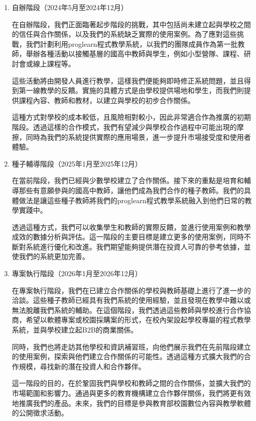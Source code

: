 \begin{enumerate}
  \setlength{\parindent}{2em}
  \item 自辦階段（2024年5月至2024年12月）
  \par 在自辦階段，我們正面臨著起步階段的挑戰，其中包括尚未建立起與學校之間的信任與合作關係，以及我們的系統缺乏實際的使用案例。為了應對這些挑戰，我們計劃利用proglearn程式教學系統，以我們的團隊成員作為第一批教師，舉辦各種活動以接觸基層的國高中教師與學生，例如小型營隊、課程、研討會或線上課程等。
  \par 這些活動將由開發人員進行教學，這樣我們便能夠即時修正系統問題，並且得到第一線教學的反饋。實施的具體方式是由學校提供場地和學生，而我們則提供課程內容、教師和教材，以建立與學校的初步合作關係。
  \par 這種方式對學校的成本較低，且風險相對較小，因此非常適合作為推廣的初期階段。透過這樣的合作模式，我們有望減少與學校合作過程中可能出現的摩擦，同時為我們的系統提供實際的應用場景，進一步提升市場接受度和使用者體驗。
  \item 種子輔導階段（2025年1月至2025年12月）
  \par 在當前階段，我們已經與少數學校建立了合作關係。接下來的重點是培育和輔導那些有意願參與的國高中教師，讓他們成為我們合作的種子教師。我們的具體做法是讓這些種子教師將我們的proglearn程式教學系統融入到他們日常的教學實踐中。
  \par 透過這種方式，我們可以收集學生和教師的實際反饋，並進行使用案例和教學成效的數據分析與評估。這一階段的主要目標是建立更多的使用案例，同時不斷對系統進行優化和改進。我們期望能夠提供潛在投資人可靠的參考依據，並使我們的系統更加完善。
  \item 專案執行階段（2026年1月至2026年12月）
  \par 在專案執行階段，我們在已建立合作關係的學校與教師基礎上進行了進一步的洽談。這些種子教師已經具有我們系統的使用經驗，並且發現在教學中難以或無法脫離我們系統的輔助。在這個階段，我們透過這些教師與學校進行合作協商，希望以軟體專案或校園採購案的形式，在校內架設起學校專屬的程式教學系統，並與學校建立起B2B的商業關係。
  \par 同時，我們也將走訪其他學校和資訊補習班，向他們展示我們在先前階段建立的使用案例，探索與他們建立合作關係的可能性。透過這種方式擴大我們的合作規模，尋找新的潛在投資人和合作夥伴。
  \par 這一階段的目的，在於鞏固我們與學校和教師之間的合作關係，並擴大我們的市場範圍和影響力。通過與更多的教育機構建立合作夥伴關係，我們將更有效地推廣我們的產品。未來，我們的目標是參與教育部校園數位內容與教學軟體的公開徵求活動。
\end{enumerate}